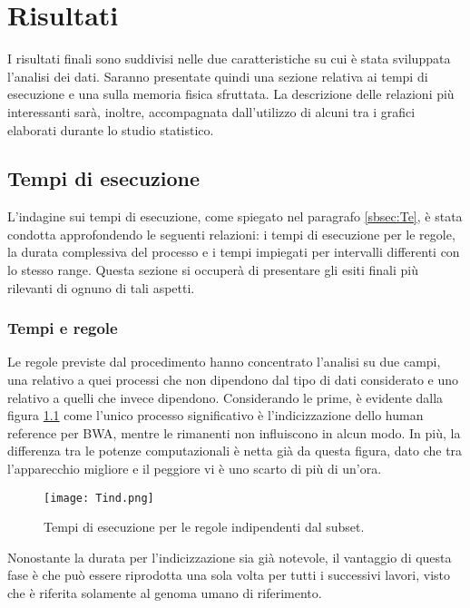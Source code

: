 \chapter{Risultati}
\label{cap:3}
I risultati finali sono suddivisi nelle due caratteristiche su cui è stata sviluppata l'analisi dei dati.
Saranno presentate quindi una sezione relativa ai tempi di esecuzione e una sulla memoria fisica sfruttata. 
La descrizione delle relazioni più interessanti sarà, inoltre, accompagnata dall'utilizzo di alcuni tra i grafici elaborati durante lo studio statistico.

\section{Tempi di esecuzione}
L'indagine sui tempi di esecuzione, come spiegato nel paragrafo \ref{sbsec:Te}, è stata condotta approfondendo le seguenti relazioni: i tempi di esecuzione per le regole, la durata complessiva del processo e i tempi impiegati per intervalli differenti con lo stesso range. 
Questa sezione si occuperà di presentare gli esiti finali più rilevanti di ognuno di tali aspetti.

\subsection{Tempi e regole}
Le regole previste dal procedimento hanno concentrato l'analisi su due campi, una relativo a quei processi che non dipendono dal tipo di dati considerato e uno relativo a quelli che invece dipendono. 
Considerando le prime, è evidente dalla figura \ref{fig:Tind} come l'unico processo significativo è l'indicizzazione dello human reference per BWA, mentre le rimanenti non influiscono in alcun modo. 
In più, la differenza tra le potenze computazionali è netta già da questa figura, dato che tra l'apparecchio migliore e il peggiore vi è uno scarto di più di un'ora.
\begin{figure}[H]
\centering
\texttt{[image: Tind.png]}
\caption{Tempi di esecuzione per le regole indipendenti dal subset.}
\label{fig:Tind}
\end{figure}
Nonostante la durata per l'indicizzazione sia già notevole, il vantaggio di questa fase  è che può essere riprodotta una sola volta per tutti i successivi lavori, visto che è riferita solamente al genoma umano di riferimento.


